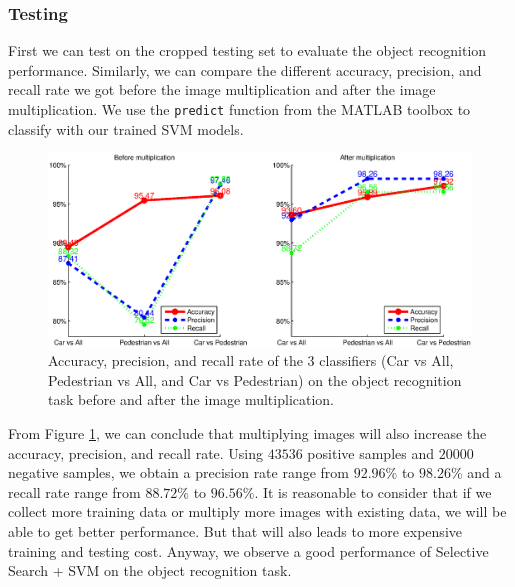 \documentclass{article} %
\begin{document}
\subsubsection{Testing}

First we can test on the cropped testing set to evaluate the object recognition performance. Similarly, we can compare the different accuracy, precision, and recall rate we got before the image multiplication and after the image multiplication. We use the \texttt{predict} function from the MATLAB toolbox to classify with our trained SVM models.


\begin{figure}[htb]
\begin{center}
\includegraphics[width=\textwidth]{test_apr.eps}
\end{center}
\caption{Accuracy, precision, and recall rate of the 3 classifiers (Car vs All, Pedestrian vs All, and Car vs Pedestrian) on the object recognition task before and after the image multiplication.
\label{fig:test_apr}}
\end{figure}


From Figure \ref{fig:test_apr}, we can conclude that multiplying images will also increase the accuracy, precision, and recall rate. Using $43536$ positive samples and $20000$ negative samples, we obtain a precision rate range from $92.96\%$ to $98.26\%$ and a recall rate range from $88.72\%$ to $96.56\%$. It is reasonable to consider that if we collect more training data or multiply more images with existing data, we will be able to get better performance. But that will also leads to more expensive training and testing cost. Anyway, we observe a good performance of Selective Search + SVM on the object recognition task.
\end{document}
